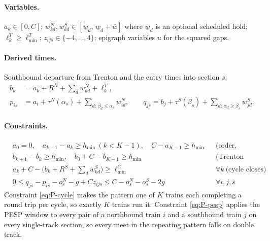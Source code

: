 \documentclass[11pt]{article}
\begin{document}
\paragraph{Variables.} $a_k\in[0,C]$; $w^N_{kd},w^S_{kd}\in[\underline{w}_d,\,\underline{w}_d+\bar w]$ where $\underline w_d$ is an optional scheduled hold; $\ell^T_k\ge\ell^T_{\min}$; $z_{ijs}\in\{-4,\dots,4\}$; epigraph variables $u$ for the squared gaps.
\paragraph{Derived times.} Southbound departure from Trenton and the entry times into section $s$:
\begin{align*}
b_k&=a_k+R^N+\textstyle\sum_d w^N_{kd}+\ell^T_k,\\
p_{is}&=a_i+\tau^N(\alpha_s)+\textstyle\sum_{d:\,\beta_d\le\alpha_s}w^N_{id},\qquad
q_{js}=b_j+\tau^S(\beta_s)+\textstyle\sum_{d:\,\alpha_d\ge\beta_s}w^S_{jd}.
\end{align*}
\paragraph{Constraints.}
\begin{align}
& a_0=0,\quad a_{k+1}-a_k\ge h_{\min}\ (k<K-1),\quad C-a_{K-1}\ge h_{\min} && \text{(order, symmetry)}\label{eq:P-order}\\
& b_{k+1}-b_k\ge h_{\min},\quad b_0+C-b_{K-1}\ge h_{\min} && \text{(Trenton spacing)}\\
& a_k+C-\bigl(b_k+R^S+\textstyle\sum_d w^S_{kd}\bigr)\ge \ell^C_{\min} && \forall k\ \text{(cycle closes)}\label{eq:P-cycle}\\
& 0\le q_{js}-p_{is}-o^N_s-g+Cz_{ijs}\le C-o^N_s-o^S_s-2g && \forall i,j,s \label{eq:P-pesp}
\end{align}
Constraint \eqref{eq:P-cycle} makes the pattern one of $K$ trains each completing a round trip per cycle, so exactly $K$ trains run it. Constraint \eqref{eq:P-pesp} applies the PESP window to every pair of a northbound train $i$ and a southbound train $j$ on every single-track section, so every meet in the repeating pattern falls on double track.
\end{document}
